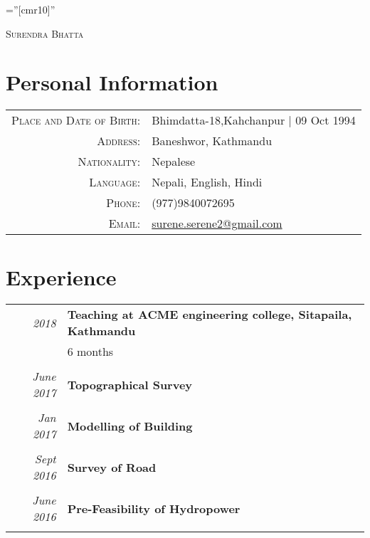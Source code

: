 \documentclass[a4paper,10pt]{article}
\begin{document}

\pagestyle{empty} %

\font\fb=''[cmr10]'' %

\par{\centering
		{\huge \textsc{Surendra} \textsc{Bhatta}
	}\bigskip\par}


\section{Personal Information}

\begin{tabular}{rl}
    \textsc{Place and Date of Birth:} & Bhimdatta-18,Kahchanpur  | 09 Oct 1994 \\
    \textsc{Address:}   & Baneshwor, Kathmandu \\
    \textsc{Nationality:} & Nepalese\\
    \textsc{Language:} & Nepali, English, Hindi\\
    \textsc{Phone:}     & (977)9840072695\\
    \textsc{Email:}     & \href{mailto:surene.serene2@gmail.com}{surene.serene2@gmail.com}\\
\end{tabular}


\section{Experience}
\begin{tabular}{r|p{11cm}}
\emph{2018} & \textbf{Teaching at ACME engineering college, Sitapaila, Kathmandu}\\
& 6 months\\
\multicolumn{2}{c}{}\\
\emph{June 2017} & \textbf{Topographical Survey}\\\multicolumn{2}{c}{} \\
\emph{Jan 2017} & \textbf{Modelling of Building}\\\multicolumn{2}{c}{} \\
\emph{Sept 2016} & \textbf{Survey of Road}\\\multicolumn{2}{c}{} \\
\emph{June 2016} & \textbf{Pre-Feasibility of Hydropower}\\\multicolumn{2}{c}{} \\
\end{tabular}
\end{document}
